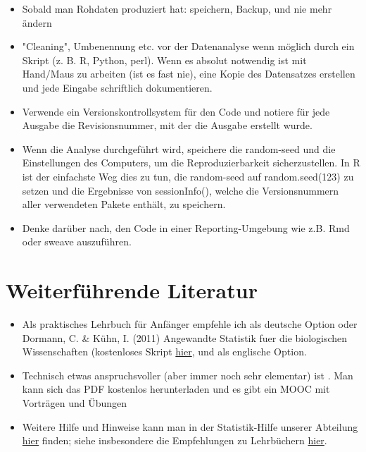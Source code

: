 \documentclass[a4paper,twoside]{tufte-book}\usepackage[]{graphicx}\usepackage[]{color}
\begin{document}
\begin{itemize}

\item{Sobald man Rohdaten produziert hat: speichern, Backup, und nie mehr ändern}

\item{"Cleaning", Umbenennung etc. vor der Datenanalyse wenn möglich durch ein Skript (z. B. R, Python, perl). Wenn es absolut notwendig ist mit Hand/Maus zu arbeiten (ist es fast nie), eine Kopie des Datensatzes erstellen und jede Eingabe schriftlich dokumentieren.}

\item{Verwende ein Versionskontrollsystem für den Code und notiere für jede Ausgabe die Revisionsnummer, mit der die Ausgabe erstellt wurde.}

\item{Wenn die Analyse durchgeführt wird, speichere die random-seed und die Einstellungen des Computers, um die Reproduzierbarkeit sicherzustellen. In R ist der einfachste Weg dies zu tun, die random-seed auf random.seed(123) zu setzen und die Ergebnisse von sessionInfo(), welche die Versionsnummern aller verwendeten Pakete enthält, zu speichern.}

\item{Denke darüber nach, den Code in einer Reporting-Umgebung wie z.B. Rmd oder sweave auszuführen.}



\end{itemize}

\section{Weiterführende Literatur}\label{sec: further readings}


\begin{itemize}


\item Als praktisches Lehrbuch für Anfänger empfehle ich als deutsche Option  \citet{Dormann-ParametrischeStatistik-2013} oder Dormann, C. \& Kühn, I. (2011) Angewandte Statistik fuer die biologischen Wissenschaften (kostenloses Skript \href{https://www.biom.uni-freiburg.de/mitarbeiter/dormann/resolveuid/ed4f35206584421e7406414aa2d4470a}{hier}, und \citet{Gotelli-PrimerEcologicalStatistics-2004} als englische Option. 

\item Technisch etwas anspruchsvoller (aber immer noch sehr elementar) ist \citet{James-IntroductiontoStatistical-2013}. Man kann sich das PDF kostenlos herunterladen und es gibt ein MOOC mit Vorträgen und Übungen

\item Weitere Hilfe und Hinweise kann man in der Statistik-Hilfe unserer Abteilung \href{http://biometry.github.io/APES/}{hier} finden; siehe insbesondere die Empfehlungen zu Lehrbüchern \href{http://biometry.github.io/APES/Stats/stats90-references.html}{hier}.

\end{itemize}
\end{document}
